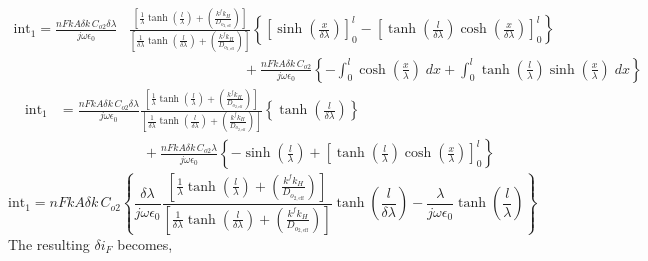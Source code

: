 \documentclass[Notes.tex]{subfiles}
\begin{document}
\begin{align}
	\textrm{int}_1 = \frac{nFkA\delta k\, C_{o2}\delta\lambda}{j\omega\epsilon_0}& \frac{\left[\frac{1}{\lambda}  \tanh{\left(\frac{l}{\lambda}\right)} + \left(\frac{k^f k_H} {D_{o_{2,\textrm{eff}}}}\right) \right]}{\left[ \frac{1} {\delta\lambda} \tanh{\left(\frac{l}{\delta\lambda}\right)} + \left(\frac{k^f k_H} {D_{o_{2,\textrm{eff}}}}\right) \right]}\left\lbrace\left[\sinh{\left(\frac{x}{\delta\lambda}\right)}\right]_0^l -  \left[\tanh{\left(\frac{l}{\delta\lambda} \right)}\cosh{\left(\frac{x}{\delta\lambda}\right)}\right]_0^l\right\rbrace\nonumber\\	&\qquad\qquad\qquad\qquad\, + \frac{nFkA\delta k\,C_{o2}}{j\omega\epsilon_0} \left\lbrace-\int_0^l\cosh{\left(\frac{x}{\lambda}\right)}\;dx + \int_0^l \tanh{\left(\frac{l}{\lambda}\right)} \sinh{\left(\frac{x}{\lambda}\right)}\;dx\right\rbrace\nonumber
\end{align}
\begin{align}
	\textrm{int}_1 &= \frac{nFkA\delta k\, C_{o2}\delta\lambda}{j\omega\epsilon_0} \frac{\left[\frac{1}{\lambda}  \tanh{\left(\frac{l}{\lambda}\right)} + \left(\frac{k^f k_H} {D_{o_{2,\textrm{eff}}}}\right) \right]}{\left[ \frac{1} {\delta\lambda} \tanh{\left(\frac{l}{\delta\lambda}\right)} + \left(\frac{k^f k_H} {D_{o_{2,\textrm{eff}}}}\right) \right]}\left\lbrace  \tanh{\left(\frac{l}{\delta\lambda} \right)}\right\rbrace\nonumber\\ 
	&\qquad\qquad\qquad + \frac{nFkA\delta k\,C_{o2}\lambda}{j\omega\epsilon_0} \left\lbrace-\sinh{\left(\frac{l}{\lambda}\right)} +  \left[\tanh{\left(\frac{l}{\lambda}\right)} \cosh{\left(\frac{x}{\lambda}\right)}\right]_0^l\right\rbrace\nonumber
\end{align}
\begin{equation}
	\textrm{int}_1 = nFkA\delta k\, C_{o2} \left\lbrace\frac{\delta\lambda}{j\omega\epsilon_0} \frac{\left[\frac{1}{\lambda}  \tanh{\left(\frac{l}{\lambda}\right)} + \left(\frac{k^f k_H} {D_{o_{2,\textrm{eff}}}}\right) \right]}{\left[ \frac{1} {\delta\lambda} \tanh{\left(\frac{l}{\delta\lambda}\right)} + \left(\frac{k^f k_H} {D_{o_{2,\textrm{eff}}}}\right) \right]}\tanh{\left(\frac{l}{\delta\lambda} \right)} - \frac{\lambda}{j\omega\epsilon_0} \tanh{\left(\frac{l}{\lambda}\right)} \right\rbrace \label{eq:int_1_diffusion_kinetics_df}
\end{equation}
The resulting $\delta i_F$ becomes,
\end{document}
